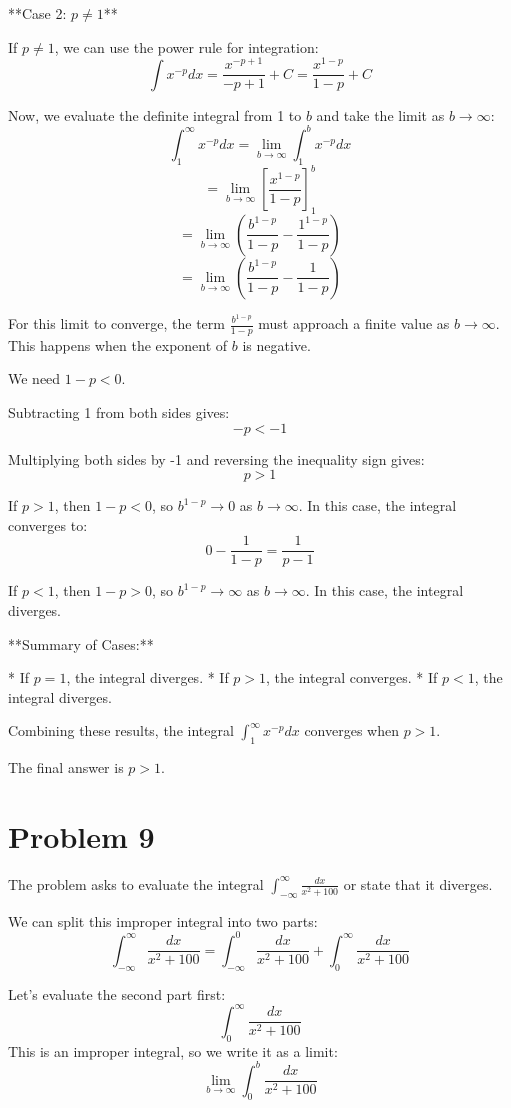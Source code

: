 \documentclass{article}
\begin{document}
**Case 2: $p \neq 1$**

If $p \neq 1$, we can use the power rule for integration:
$$ \int x^{-p} dx = \frac{x^{-p+1}}{-p+1} + C = \frac{x^{1-p}}{1-p} + C $$

Now, we evaluate the definite integral from 1 to $b$ and take the limit as $b \to \infty$:
$$ \int_{1}^{\infty} x^{-p} dx = \lim_{b \to \infty} \int_{1}^{b} x^{-p} dx $$
$$ = \lim_{b \to \infty} \left[ \frac{x^{1-p}}{1-p} \right]_{1}^{b} $$
$$ = \lim_{b \to \infty} \left( \frac{b^{1-p}}{1-p} - \frac{1^{1-p}}{1-p} \right) $$
$$ = \lim_{b \to \infty} \left( \frac{b^{1-p}}{1-p} - \frac{1}{1-p} \right) $$

For this limit to converge, the term $\frac{b^{1-p}}{1-p}$ must approach a finite value as $b \to \infty$. This happens when the exponent of $b$ is negative.

We need $1-p < 0$.

Subtracting 1 from both sides gives:
$$ -p < -1 $$

Multiplying both sides by -1 and reversing the inequality sign gives:
$$ p > 1 $$

If $p > 1$, then $1-p < 0$, so $b^{1-p} \to 0$ as $b \to \infty$. In this case, the integral converges to:
$$ 0 - \frac{1}{1-p} = \frac{1}{p-1} $$

If $p < 1$, then $1-p > 0$, so $b^{1-p} \to \infty$ as $b \to \infty$. In this case, the integral diverges.

**Summary of Cases:**

*   If $p=1$, the integral diverges.
*   If $p>1$, the integral converges.
*   If $p<1$, the integral diverges.

Combining these results, the integral $\int_{1}^{\infty} x^{-p} dx$ converges when $p > 1$.

The final answer is $\boxed{p>1}$.

\newpage

\section*{Problem 9}
The problem asks to evaluate the integral $\int_{-\infty}^{\infty} \frac{dx}{x^2 + 100}$ or state that it diverges.

We can split this improper integral into two parts:
$$ \int_{-\infty}^{\infty} \frac{dx}{x^2 + 100} = \int_{-\infty}^{0} \frac{dx}{x^2 + 100} + \int_{0}^{\infty} \frac{dx}{x^2 + 100} $$

Let's evaluate the second part first:
$$ \int_{0}^{\infty} \frac{dx}{x^2 + 100} $$
This is an improper integral, so we write it as a limit:
$$ \lim_{b \to \infty} \int_{0}^{b} \frac{dx}{x^2 + 100} $$
\end{document}
